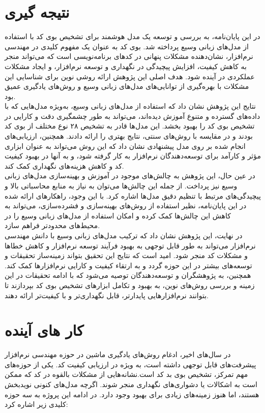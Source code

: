 
\section{نتیجه گیری}
در این پایان‌نامه، به بررسی و توسعه یک مدل هوشمند برای تشخیص بوی کد با استفاده از مدل‌های زبانی وسیع پرداخته شد. بوی کد به عنوان یک مفهوم کلیدی در مهندسی نرم‌افزار، نشان‌دهنده مشکلات پنهانی در کدهای برنامه‌نویسی است که می‌تواند منجر به کاهش کیفیت، افزایش پیچیدگی در نگهداری و توسعه نرم‌افزار، و ایجاد مشکلات عملکردی در آینده شود. هدف اصلی این پژوهش ارائه روشی نوین برای شناسایی این مشکلات با بهره‌گیری از توانایی‌های مدل‌های زبانی وسیع و روش‌های یادگیری عمیق بود.
\\
نتایج این پژوهش نشان داد که استفاده از مدل‌های زبانی وسیع، به‌ویژه مدل‌هایی که با داده‌های گسترده و متنوع آموزش دیده‌اند، می‌تواند به طور چشمگیری دقت و کارایی در تشخیص بوی کد را بهبود بخشد. این مدل‌ها قادر به تشخیص ۲۸ نوع مختلف از بوی کد بودند و در مقایسه با روش‌های سنتی، نتایج بهتری را ارائه دادند. همچنین، ارزیابی‌های انجام شده بر روی مدل پیشنهادی نشان داد که این روش می‌تواند به عنوان ابزاری مؤثر و کارآمد برای توسعه‌دهندگان نرم‌افزار به کار گرفته شود، و به آنها در بهبود کیفیت کد و کاهش هزینه‌های نگهداری کمک کند.
\\
در عین حال، این پژوهش به چالش‌های موجود در آموزش و بهینه‌سازی مدل‌های زبانی وسیع نیز پرداخت. از جمله این چالش‌ها می‌توان به نیاز به منابع محاسباتی بالا و پیچیدگی‌های مرتبط با تنظیم دقیق مدل‌ها اشاره کرد. با این وجود، راهکارهای ارائه شده در این پایان‌نامه، نظیر استفاده از روش‌های بهینه‌سازی و فشرده‌سازی، می‌تواند به کاهش این چالش‌ها کمک کرده و امکان استفاده از مدل‌های زبانی وسیع را در محیط‌های محدودتر فراهم سازد.
\\
در نهایت، این پژوهش نشان داد که ترکیب مدل‌های زبانی وسیع با دانش مهندسی نرم‌افزار می‌تواند به طور قابل توجهی به بهبود فرآیند توسعه نرم‌افزار و کاهش خطاها و مشکلات کد منجر شود. امید است که نتایج این تحقیق بتواند زمینه‌ساز تحقیقات و توسعه‌های بیشتر در این حوزه گردد و به ارتقاء کیفیت و کارایی نرم‌افزارها کمک کند. همچنین، به پژوهشگران و توسعه‌دهندگان توصیه می‌شود که با ادامه تحقیقات در این زمینه و بررسی روش‌های نوین، به بهبود و تکامل ابزارهای تشخیص بوی کد بپردازند تا بتوانند نرم‌افزارهایی پایدارتر، قابل نگهداری‌تر و با کیفیت‌تر ارائه دهند.

\section{کار های آینده}

در سال‌های اخیر، ادغام روش‌های یادگیری ماشین در حوزه مهندسی نرم‌افزار پیشرفت‌های قابل توجهی داشته است، به ویژه در ارزیابی کیفیت کد. یکی از حوزه‌های مهم تمرکز، تشخیص بوی بد کد است.نشانه‌هایی از مشکلات بالقوه در کد که ممکن است به اشکالات یا دشواری‌های نگهداری منجر شوند. اگرچه مدل‌های کنونی نویدبخش هستند، اما هنوز زمینه‌های زیادی برای بهبود وجود دارد. در ادامه این پروژه به سه حوزه کلیدی زیر اشاره کرد:

